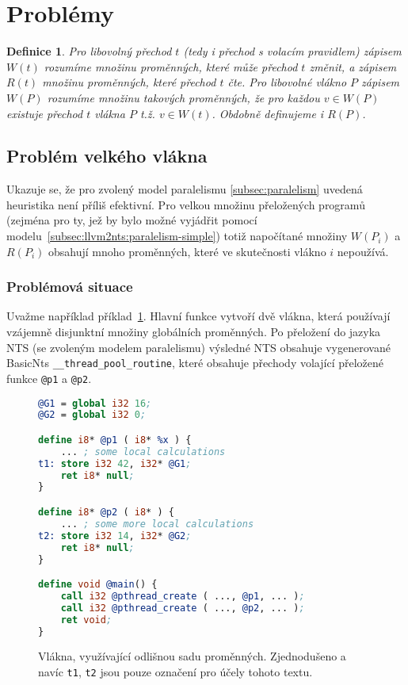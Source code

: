 \documentclass[12pt]{fithesis2}
\newtheorem{definition}{Definice}
\begin{document}
\section{Problémy}
\label{sec:por-problems}
\begin{definition}
Pro libovolný přechod $t$ (tedy i přechod s volacím pravidlem) zápisem $W(t)$ rozumíme množinu proměnných, které může přechod $t$ změnit, a zápisem $R(t)$ množinu proměnných, které přechod $t$ čte. Pro libovolné vlákno $P$ zápisem $W(P)$ rozumíme množinu takových proměnných, že pro každou $v \in W(P)$ existuje přechod $t$ vlákna $P$ t.ž. $v \in W(t)$. Obdobně definujeme i $R(P)$.
\end{definition}

\subsection{Problém velkého vlákna}
Ukazuje se, že pro zvolený model paralelismu \ref{subsec:paralelism} uvedená heuristika není příliš efektivní. Pro velkou množinu přeložených programů (zejména pro ty, jež by bylo možné vyjádřit pomocí modelu~\ref{subsec:llvm2nts:paralelism-simple}) totiž napočítané množiny $W(P_i)$ a $R(P_i)$ obsahují mnoho proměnných, které ve skutečnosti vlákno $i$ nepoužívá.


\subsubsection{Problémová situace}
Uvažme například příklad~\ref{fig:problem-big-thread}. Hlavní funkce vytvoří dvě vlákna, která používají vzájemně disjunktní množiny globálních proměnných. Po přeložení do jazyka NTS (se zvoleným modelem paralelismu) výsledné NTS obsahuje vygenerované BasicNts \texttt{__thread_pool_routine}, které obsahuje přechody volající přeložené funkce \texttt{@p1} a \texttt{@p2}.
\begin{figure}[h!]
\begin{lstlisting}[language=llvm]
@G1 = global i32 16;
@G2 = global i32 0;

define i8* @p1 ( i8* %x ) {
	... ; some local calculations
t1:	store i32 42, i32* @G1;
	ret i8* null;
}

define i8* @p2 ( i8* ) {
	... ; some more local calculations
t2:	store i32 14, i32* @G2;
	ret i8* null;
}

define void @main() {
	call i32 @pthread_create ( ..., @p1, ... );
	call i32 @pthread_create ( ..., @p2, ... );
	ret void;
}
\end{lstlisting}
\caption{Vlákna, využívající odlišnou sadu proměnných. Zjednodušeno a navíc \texttt{t1}, \texttt{t2} jsou pouze označení pro účely tohoto textu.}
\label{fig:problem-big-thread}
\end{figure}
\end{document}

